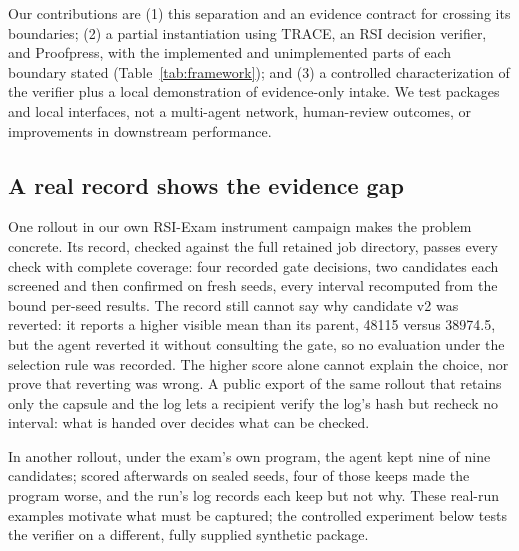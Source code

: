 \documentclass[conference]{IEEEtran}
\begin{document}
Our contributions are (1) this separation and an evidence contract for crossing its boundaries; (2) a partial instantiation using TRACE, an RSI decision verifier, and Proofpress, with the implemented and unimplemented parts of each boundary stated (Table~\ref{tab:framework}); and (3) a controlled characterization of the verifier plus a local demonstration of evidence-only intake. We test packages and local interfaces, not a multi-agent network, human-review outcomes, or improvements in downstream performance.

\subsection{A real record shows the evidence gap}
One rollout in our own RSI-Exam instrument campaign makes the problem concrete. Its record, checked against the full retained job directory, passes every check with complete coverage: four recorded gate decisions, two candidates each screened and then confirmed on fresh seeds, every interval recomputed from the bound per-seed results. The record still cannot say why candidate v2 was reverted: it reports a higher visible mean than its parent, 48115 versus 38974.5, but the agent reverted it without consulting the gate, so no evaluation under the selection rule was recorded. The higher score alone cannot explain the choice, nor prove that reverting was wrong. A public export of the same rollout that retains only the capsule and the log lets a recipient verify the log's hash but recheck no interval: what is handed over decides what can be checked.

In another rollout, under the exam's own program, the agent kept nine of nine candidates; scored afterwards on sealed seeds, four of those keeps made the program worse, and the run's log records each keep but not why. These real-run examples motivate what must be captured; the controlled experiment below tests the verifier on a different, fully supplied synthetic package.
\end{document}

